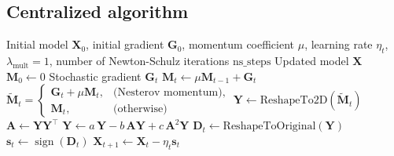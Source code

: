 \documentclass{article}
\begin{document}
\subsection{Centralized algorithm}\label{app:central_alg}
\begin{algorithm}
\caption{SignMuon}
\begin{algorithmic}[1]
\Require Initial model $\mathbf{X}_0$, initial gradient $\mathbf{G}_0$, momentum coefficient $\mu$, learning rate $\eta_t$, $\lambda_{\mathrm{mult}}=1$, number of Newton-Schulz iterations $\mathrm{ns\_steps}$
\Ensure Updated model $\mathbf{X}$
\State $\mathbf{M}_0 \gets 0$ 
    \State Stochastic gradient $\mathbf{G}_t$
    \State $\mathbf{M}_t \gets \mu \mathbf{M}_{t-1} + \mathbf{G}_t$ 
    \State $\tilde{\mathbf{M}}_t =
    \begin{cases} 
        \mathbf{G}_t + \mu \mathbf{M}_t, & \text{(Nesterov momentum)}, \\
        \mathbf{M}_t, & \text{(otherwise)}
    \end{cases}$
    \State $\mathbf{Y} \gets \text{ReshapeTo2D}(\tilde{\mathbf{M}}_t)$ 
     
        \State $\mathbf{A} \gets \mathbf{Y} \mathbf{Y}^\top$
        \State $\mathbf{Y} \gets a\,\mathbf{Y} - b\,\mathbf{A}\mathbf{Y} + c\,\mathbf{A}^2\mathbf{Y}$
    \EndFor
    \State $\mathbf{D}_t \gets \text{ReshapeToOriginal}(\mathbf{Y})$ 
    \State $\mathbf{s}_t \gets \operatorname{sign}(\mathbf{D}_t)$ 
    \State $\mathbf{X}_{t+1} \gets \mathbf{X}_t - \eta_t \mathbf{s}_t$ 
\EndFor
\label{central_alg}
\end{algorithmic}
\end{algorithm}
\end{document}
